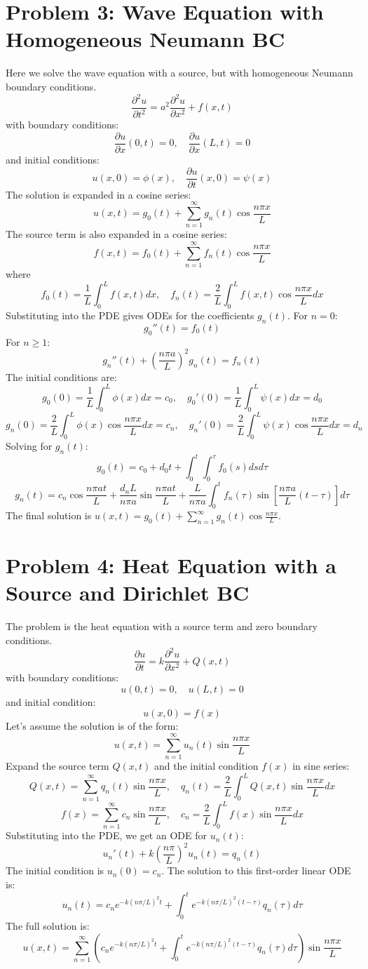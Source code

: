 \documentclass{article}
\begin{document}
	\section*{Problem 3: Wave Equation with Homogeneous Neumann BC}
	Here we solve the wave equation with a source, but with homogeneous Neumann boundary conditions.
	$$
	\frac{\partial^2 u}{\partial t^2} = a^2 \frac{\partial^2 u}{\partial x^2} + f(x, t)
	$$
	with boundary conditions:
	$$
	\frac{\partial u}{\partial x}(0, t) = 0, \quad \frac{\partial u}{\partial x}(L, t) = 0
	$$
	and initial conditions:
	$$
	u(x, 0) = \phi(x), \quad \frac{\partial u}{\partial t}(x, 0) = \psi(x)
	$$
	The solution is expanded in a cosine series:
	$$
	u(x, t) = g_0(t) + \sum_{n=1}^{\infty} g_n(t) \cos\frac{n\pi x}{L}
	$$
	The source term is also expanded in a cosine series:
	$$
	f(x, t) = f_0(t) + \sum_{n=1}^{\infty} f_n(t) \cos\frac{n\pi x}{L}
	$$
	where
	$$
	f_0(t) = \frac{1}{L} \int_0^L f(x,t) dx, \quad f_n(t) = \frac{2}{L} \int_0^L f(x, t) \cos\frac{n\pi x}{L} dx
	$$
	Substituting into the PDE gives ODEs for the coefficients $g_n(t)$.
	For $n=0$:
	$$
	g_0''(t) = f_0(t)
	$$
	For $n \ge 1$:
	$$
	g_n''(t) + \left(\frac{n\pi a}{L}\right)^2 g_n(t) = f_n(t)
	$$
	The initial conditions are:
	$$
	g_0(0) = \frac{1}{L} \int_0^L \phi(x) dx = c_0, \quad g_0'(0) = \frac{1}{L} \int_0^L \psi(x) dx = d_0
	$$
	$$
	g_n(0) = \frac{2}{L} \int_0^L \phi(x) \cos\frac{n\pi x}{L} dx = c_n, \quad g_n'(0) = \frac{2}{L} \int_0^L \psi(x) \cos\frac{n\pi x}{L} dx = d_n
	$$
	Solving for $g_n(t)$:
	$$
	g_0(t) = c_0 + d_0 t + \int_0^t \int_0^\tau f_0(s) ds d\tau
	$$
	$$
	g_n(t) = c_n \cos\frac{n\pi a t}{L} + \frac{d_n L}{n\pi a} \sin\frac{n\pi a t}{L} + \frac{L}{n\pi a} \int_0^t f_n(\tau) \sin\left[\frac{n\pi a}{L}(t-\tau)\right] d\tau
	$$
	The final solution is $u(x,t) = g_0(t) + \sum_{n=1}^{\infty} g_n(t) \cos\frac{n\pi x}{L}$.
	
	\section*{Problem 4: Heat Equation with a Source and Dirichlet BC}
	The problem is the heat equation with a source term and zero boundary conditions.
	$$
	\frac{\partial u}{\partial t} = k \frac{\partial^2 u}{\partial x^2} + Q(x, t)
	$$
	with boundary conditions:
	$$
	u(0, t) = 0, \quad u(L, t) = 0
	$$
	and initial condition:
	$$
	u(x, 0) = f(x)
	$$
	Let's assume the solution is of the form:
	$$
	u(x, t) = \sum_{n=1}^{\infty} u_n(t) \sin\frac{n\pi x}{L}
	$$
	Expand the source term $Q(x,t)$ and the initial condition $f(x)$ in sine series:
	$$
	Q(x, t) = \sum_{n=1}^{\infty} q_n(t) \sin\frac{n\pi x}{L}, \quad q_n(t) = \frac{2}{L} \int_0^L Q(x,t) \sin\frac{n\pi x}{L} dx
	$$
	$$
	f(x) = \sum_{n=1}^{\infty} c_n \sin\frac{n\pi x}{L}, \quad c_n = \frac{2}{L} \int_0^L f(x) \sin\frac{n\pi x}{L} dx
	$$
	Substituting into the PDE, we get an ODE for $u_n(t)$:
	$$
	u_n'(t) + k\left(\frac{n\pi}{L}\right)^2 u_n(t) = q_n(t)
	$$
	The initial condition is $u_n(0) = c_n$.
	The solution to this first-order linear ODE is:
	$$
	u_n(t) = c_n e^{-k(n\pi/L)^2 t} + \int_0^t e^{-k(n\pi/L)^2(t-\tau)} q_n(\tau) d\tau
	$$
	The full solution is:
	$$
	u(x, t) = \sum_{n=1}^{\infty} \left( c_n e^{-k(n\pi/L)^2 t} + \int_0^t e^{-k(n\pi/L)^2(t-\tau)} q_n(\tau) d\tau \right) \sin\frac{n\pi x}{L}
	$$
\end{document}

